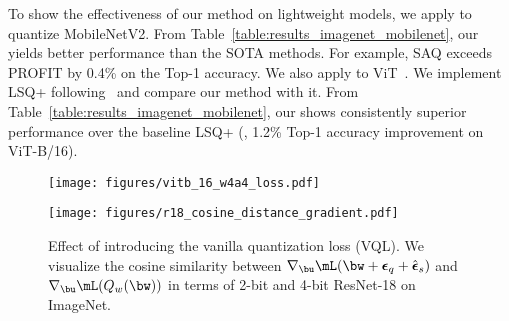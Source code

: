 To show the effectiveness of our method on lightweight models, we apply \methodshortname to quantize MobileNetV2. From Table~\ref{table:results_imagenet_mobilenet}, our \methodshortname yields better performance than the SOTA  methods. For example, SAQ exceeds PROFIT by 0.4\% on the Top-1 accuracy. We also apply \methodshortname to ViT~\cite{dosovitskiy2020image}. We implement LSQ+ following~\cite{li2022q} and compare our method with it. From Table~\ref{table:results_imagenet_mobilenet}, our \methodshortname shows consistently superior performance over the baseline LSQ+ (\eg, 1.2\% Top-1 accuracy improvement on ViT-B/16). 


\begin{figure}[!t]

        \begin{minipage}[t]{0.22\textwidth}
        \centering
        \texttt{[image: figures/vitb\_16\_w4a4\_loss.pdf]}
        \vspace{-0.1in}
        \caption{}
        \label{fig:curve_comparisons}
        \end{minipage}
        \hspace{0.05in}
        \begin{minipage}[t]{0.23\textwidth}
        \centering
        \texttt{[image: figures/r18\_cosine\_distance\_gradient.pdf]}
        \vspace{-0.1in}
        \caption{Effect of introducing the vanilla quantization loss (VQL). We visualize the cosine similarity between $\nabla_{\bu} \mL(\bw + \boldsymbol{\epsilon}_q + \hat{\boldsymbol{\epsilon}}_s)$ and $\nabla_{\bu} \mL( Q_w(\bw) )$ in terms of 2-bit and 4-bit ResNet-18 on ImageNet.}
        \label{fig:cosine_distance_two_loss}
        \end{minipage}
    \vspace{-0.3in}
\end{figure}

